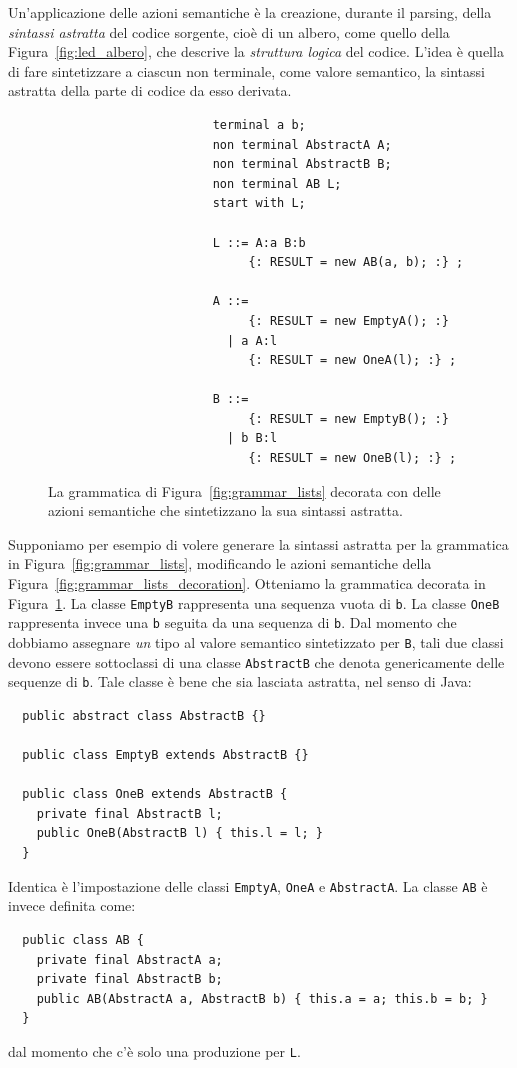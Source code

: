 Un'applicazione delle azioni semantiche \`e la creazione, durante il
parsing, della \emph{sintassi astratta}
del codice sorgente, cio\`e di un albero,
come quello della Figura~\ref{fig:led_albero}, che descrive la \emph{struttura
logica} del codice. L'idea \`e quella di fare
sintetizzare a ciascun non terminale, come valore semantico, la sintassi
astratta della parte di codice da esso derivata.

\begin{figure}[t]
\begin{verbatim}
                       terminal a b;
                       non terminal AbstractA A;
                       non terminal AbstractB B;
                       non terminal AB L;
                       start with L;

                       L ::= A:a B:b
                            {: RESULT = new AB(a, b); :} ;

                       A ::=
                            {: RESULT = new EmptyA(); :}
                         | a A:l
                            {: RESULT = new OneA(l); :} ;

                       B ::=
                            {: RESULT = new EmptyB(); :}
                         | b B:l
                            {: RESULT = new OneB(l); :} ;
\end{verbatim}
\caption{La grammatica di Figura~\ref{fig:grammar_lists} decorata con delle
         azioni semantiche che sintetizzano la sua sintassi astratta.}
  \label{fig:grammar_lists_abstract_syntax}
\end{figure}

Supponiamo per esempio di volere generare la sintassi astratta per la
grammatica in Figura~\ref{fig:grammar_lists}, modificando le azioni semantiche
della Figura~\ref{fig:grammar_lists_decoration}. Otteniamo la grammatica
decorata in Figura~\ref{fig:grammar_lists_abstract_syntax}.
La classe \texttt{EmptyB} rappresenta una sequenza vuota di \texttt{b}.
La classe \texttt{OneB} rappresenta invece una \texttt{b} seguita da una
sequenza di \texttt{b}. Dal momento che dobbiamo assegnare \emph{un} tipo
al valore semantico sintetizzato per \texttt{B}, tali due classi devono
essere sottoclassi di una classe \texttt{AbstractB} che denota
genericamente delle sequenze di \texttt{b}. Tale classe \`e bene che
sia lasciata astratta, nel senso di Java:
%
\begin{verbatim}
  public abstract class AbstractB {}

  public class EmptyB extends AbstractB {}

  public class OneB extends AbstractB {
    private final AbstractB l;
    public OneB(AbstractB l) { this.l = l; }
  }
\end{verbatim}
%
Identica \`e l'impostazione delle classi \texttt{EmptyA},
\texttt{OneA} e \texttt{AbstractA}. La classe \texttt{AB} \`e invece definita
come:
%
\begin{verbatim}
  public class AB {
    private final AbstractA a;
    private final AbstractB b;
    public AB(AbstractA a, AbstractB b) { this.a = a; this.b = b; }
  }
\end{verbatim}
%
dal momento che c'\`e solo una produzione per \texttt{L}.

